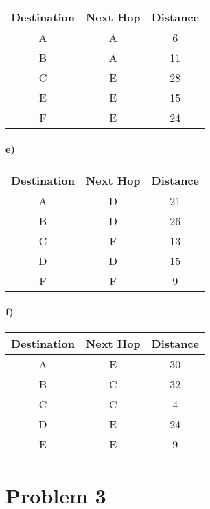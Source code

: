 \documentclass[12pt]{article}
\begin{document}
\begin{center}
    \begin{tabular}{c|c|c}
        Destination & Next Hop & Distance\\
        \hline
        A & A & 6\\
        B & A & 11\\
        C & E & 28\\
        E & E & 15\\
        F & E & 24
    \end{tabular}
\end{center}

\paragraph{e)}

\begin{center}
    \begin{tabular}{c|c|c}
        Destination & Next Hop & Distance\\
        \hline
        A & D & 21\\
        B & D & 26\\
        C & F & 13\\
        D & D & 15\\
        F & F & 9
    \end{tabular}
\end{center}

\paragraph{f)}

\begin{center}
    \begin{tabular}{c|c|c}
        Destination & Next Hop & Distance\\
        \hline
        A & E & 30\\
        B & C & 32\\
        C & C & 4\\
        D & E & 24\\
        E & E & 9
    \end{tabular}
\end{center}

\section*{Problem 3}
\end{document}
